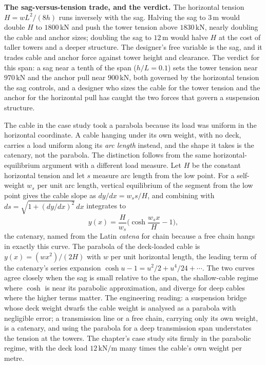 \textbf{The sag-versus-tension trade, and the verdict.} The horizontal
tension $H = wL^2/(8h)$ runs inversely with the sag. Halving the sag to
$3\,\si{\meter}$ would double $H$ to $1800\,\text{kN}$ and push the tower
tension above $1830\,\text{kN}$, nearly doubling the cable and anchor sizes;
doubling the sag to $12\,\si{\meter}$ would halve $H$ at the cost of taller
towers and a deeper structure. The designer's free variable is the sag, and
it trades cable and anchor force against tower height and clearance. The
verdict for this span: a sag near a tenth of the span ($h/L = 0.1$) sets the
tower tension near $970\,\text{kN}$ and the anchor pull near $900\,\text{kN}$,
both governed by the horizontal tension the sag controls, and a designer who
sizes the cable for the tower tension and the anchor for the horizontal pull
has caught the two forces that govern a suspension structure.

\begin{mastery}
The cable in the case study took a parabola because its load was uniform in
the horizontal coordinate. A cable hanging under its own weight, with no
deck, carries a load uniform along its \emph{arc length} instead, and the
shape it takes is the catenary, not the parabola. The distinction follows
from the same horizontal-equilibrium argument with a different load measure.
Let $H$ be the constant horizontal tension and let $s$ measure arc length
from the low point. For a self-weight $w_s$ per unit arc length, vertical
equilibrium of the segment from the low point gives the cable slope as
$dy/dx = w_s s / H$, and combining with $ds = \sqrt{1 + (dy/dx)^2}\,dx$
integrates to
\[
y(x) = \frac{H}{w_s}\Big(\cosh\frac{w_s x}{H} - 1\Big),
\]
the catenary, named from the Latin \emph{catena} for chain because a free
chain hangs in exactly this curve. The parabola of the deck-loaded cable is
$y(x) = (w x^2)/(2H)$ with $w$ per unit horizontal length, the leading term
of the catenary's series expansion $\cosh u - 1 = u^2/2 + u^4/24 + \cdots$.
The two curves agree closely when the sag is small relative to the span, the
shallow-cable regime where $\cosh$ is near its parabolic approximation, and
diverge for deep cables where the higher terms matter. The engineering
reading: a suspension bridge whose deck weight dwarfs the cable weight is
analysed as a parabola with negligible error; a transmission line or a free
chain, carrying only its own weight, is a catenary, and using the parabola
for a deep transmission span understates the tension at the towers. The
chapter's case study sits firmly in the parabolic regime, with the deck load
$12\,\text{kN}/\text{m}$ many times the cable's own weight per metre.
\end{mastery}


